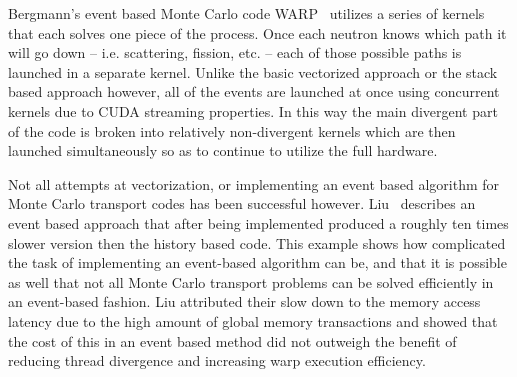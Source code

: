 Bergmann's event based Monte Carlo code WARP~\cite{2014development} utilizes a series of kernels that each solves one piece of the process.
%
Once each neutron knows which path it will go down -- i.e. scattering, fission, etc. -- each of those possible paths is launched in a separate kernel.
%
Unlike the basic vectorized approach or the stack based approach however, all of the events are launched at once using concurrent kernels due to CUDA streaming properties.
%
In this way the main divergent part of the code is broken into relatively non-divergent kernels which are then launched simultaneously so as to continue to utilize the full hardware.

Not all attempts at vectorization, or implementing an event based algorithm for Monte Carlo transport codes has been successful however.
%
Liu~\cite{liu2014comparative} describes an event based approach that after being implemented produced a roughly ten times slower version then the history based code.
%
This example shows how complicated the task of implementing an event-based algorithm can be, and that it is possible as well that not all Monte Carlo transport problems can be solved efficiently in an event-based fashion.
%
Liu attributed their slow down to the memory access latency due to the high amount of global memory transactions and showed that the cost of this in an event based method did not outweigh the benefit of reducing thread divergence and increasing warp execution efficiency.





